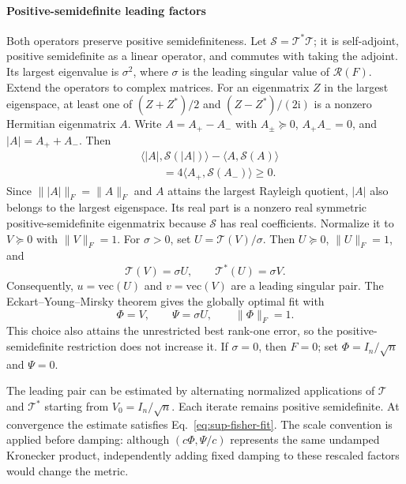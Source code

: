 \paragraph{Positive-semidefinite leading factors}
Both operators preserve positive semidefiniteness. Let $\mathcal S=\mathcal T^*\mathcal T$; it is self-adjoint, positive semidefinite as a linear operator, and commutes with taking the adjoint. Its largest eigenvalue is $\sigma^2$, where $\sigma$ is the leading singular value of $\mathcal R(F)$. Extend the operators to complex matrices. For an eigenmatrix $Z$ in the largest eigenspace, at least one of $(Z+Z^*)/2$ and $(Z-Z^*)/(2\mathrm i)$ is a nonzero Hermitian eigenmatrix $A$. Write $A=A_+-A_-$ with $A_\pm\succeq0$, $A_+A_-=0$, and $|A|=A_++A_-$. Then
\begin{equation}
\begin{aligned}
&\langle|A|,\mathcal S(|A|)\rangle
-\langle A,\mathcal S(A)\rangle\\
&\qquad=4\langle A_+,\mathcal S(A_-)\rangle\ge0.
\end{aligned}
\end{equation}
Since $\||A|\|_F=\|A\|_F$ and $A$ attains the largest Rayleigh quotient, $|A|$ also belongs to the largest eigenspace. Its real part is a nonzero real symmetric positive-semidefinite eigenmatrix because $\mathcal S$ has real coefficients. Normalize it to $V\succeq0$ with $\|V\|_F=1$. For $\sigma>0$, set $U=\mathcal T(V)/\sigma$. Then $U\succeq0$, $\|U\|_F=1$, and
\begin{equation}
\mathcal T(V)=\sigma U,\qquad
\mathcal T^*(U)=\sigma V.
\end{equation}
Consequently, $u=\mathrm{vec}(U)$ and $v=\mathrm{vec}(V)$ are a leading singular pair. The Eckart--Young--Mirsky theorem gives the globally optimal fit with
\begin{equation}
\Phi=V,\qquad\Psi=\sigma U,\qquad\|\Phi\|_F=1.
\label{eq:sup-fisher-fit}
\end{equation}
This choice also attains the unrestricted best rank-one error, so the positive-semidefinite restriction does not increase it. If $\sigma=0$, then $F=0$; set $\Phi=I_n/\sqrt n$ and $\Psi=0$.

The leading pair can be estimated by alternating normalized applications of $\mathcal T$ and $\mathcal T^*$ starting from $V_0=I_n/\sqrt n$. Each iterate remains positive semidefinite. At convergence the estimate satisfies Eq.~\eqref{eq:sup-fisher-fit}. The scale convention is applied before damping: although $(c\Phi,\Psi/c)$ represents the same undamped Kronecker product, independently adding fixed damping to these rescaled factors would change the metric.

